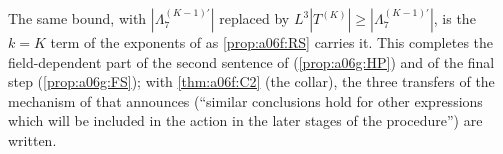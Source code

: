 The same bound, with $|\Lambda^{(K-1)'}_7|$ replaced by $L^3|T^{(K)}|\ge|\Lambda^{(K-1)'}_7|$, is the $k=K$ term of the exponents of \cite[(3.42)]{Ba2} as \cref{prop:a06f:RS} carries it. This completes the field-dependent part of the second sentence of \cite[p.~579]{Ba2} (\cref{prop:a06g:HP}) and of the final step (\cref{prop:a06g:FS}); with \cref{thm:a06f:C2} (the collar), the three transfers of the mechanism of \cite[Prop.~2.1]{Ba2} that \cite[p.~570]{Ba2} announces (``similar conclusions hold for other expressions which will be included in the action in the later stages of the procedure'') are written.
